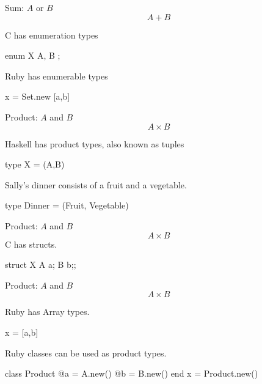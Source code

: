 \documentclass{beamer}
\begin{document}
\begin{frame}[fragile]
Sum: $A$ or $B$\newline\newline
$$A + B $$

C has enumeration types
\begin{ccode} 
enum X { A, B };
\end{ccode}

Ruby has enumerable types
\begin{rcode} 
x = Set.new [a,b]
\end{rcode}

\end{frame}


\begin{frame}[fragile]
Product: $A$ and $B$\newline\newline
$$A \times B$$

Haskell has product types, also known as tuples
\begin{code}
type X = (A,B)
\end{code}

Sally's dinner consists of a fruit and a vegetable.
\begin{code}
type Dinner =  (Fruit, Vegetable)
\end{code}
\end{frame}

\begin{frame}[fragile]
Product: $A$ and $B$\newline\newline
$$A \times B$$
\newline\newline
C has structs.\newline\newline
\begin{ccode}
struct X{ A a; B b;};
\end{ccode}

\end{frame}

\begin{frame}[fragile]
Product: $A$ and $B$\newline\newline
$$A \times B$$

\newline\newline
Ruby has Array types.
\begin{rcode}
x = [a,b]
\end{rcode}
\newline\newline 
Ruby classes can be used as product types.
\begin{rcode}
class Product
  @a = A.new()
  @b = B.new() 
end
x = Product.new()
\end{rcode}

\end{frame}
\end{document}
